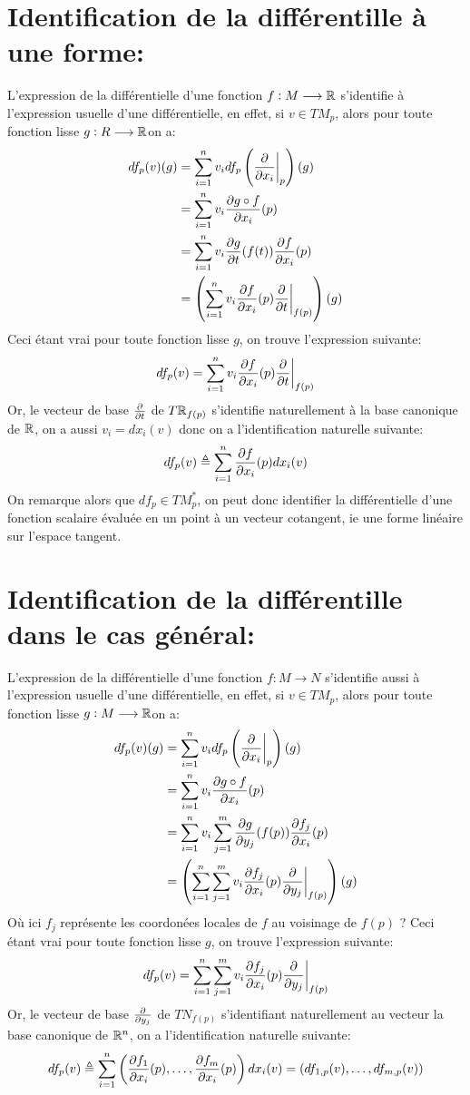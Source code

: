 \section{Identification de la différentille à une forme:}
L'expression de la différentielle d'une fonction \( f : M \longrightarrow \mathbb{R} \) s'identifie à l'expression usuelle d'une différentielle, en effet, si \( v \in TM_p \), alors pour toute fonction lisse \( g : R \longrightarrow \mathbb{R} \)on a:
\begin{align*}
   df_p(v)(g) &= \sum_{i=1}^n v_i df_p\left(\frac{\partial }{\partial x_i}\biggr|_p\right)(g)\\
   &= \sum_{i=1}^n v_i \frac{\partial g \circ f}{\partial x_i}(p)\\
   &= \sum_{i=1}^n v_i \frac{\partial g}{\partial t}(f(t))\frac{\partial f}{\partial x_i}(p)\\
   &= \left(\sum_{i=1}^n v_i \frac{\partial f}{\partial x_i}(p)\frac{\partial }{\partial t}\biggr|_{f(p)}\right)(g)
\end{align*}
Ceci étant vrai pour toute fonction lisse \( g \), on trouve l'expression suivante:
\[ 
   df_p(v) = \sum_{i=1}^n v_i \frac{\partial f}{\partial x_i}(p)\frac{\partial }{\partial t}\biggr|_{f(p)}
\]
Or, le vecteur de base \(\frac{\partial }{\partial t}\) de \( T\mathbb{R}_{f(p)} \) s'identifie naturellement à la base canonique de \( \mathbb{R} \), on a aussi \( v_i = dx_i(v) \) donc on a l'identification naturelle suivante:
\[ 
   df_p(v) \triangleq \sum_{i=1}^n \frac{\partial f}{\partial x_i}(p)dx_i(v)
\]
On remarque alors que \( df_p \in TM^*_p \), on peut donc identifier la différentielle d'une fonction scalaire évaluée en un point à un vecteur cotangent, ie une forme linéaire sur l'espace tangent.
\section{Identification de la différentille dans le cas général:}
L'expression de la différentielle d'une fonction \( f : M \longrightarrow N \) s'identifie aussi à l'expression usuelle d'une différentielle, en effet, si \( v \in TM_p \), alors pour toute fonction lisse \( g : M \longrightarrow \mathbb{R} \)on a:
\begin{align*}
   df_p(v)(g) &= \sum_{i=1}^n v_i df_p\left(\frac{\partial }{\partial x_i}\biggr|_p\right)(g)\\
   &= \sum_{i=1}^n v_i \frac{\partial g \circ f}{\partial x_i}(p)\\
   &= \sum_{i=1}^n v_i \sum_{j=1}^m \frac{\partial g}{\partial y_j}(f(p)) \frac{\partial f_j}{\partial x_i}(p)\\
   &= \left(\sum_{i=1}^n\sum_{j=1}^m v_i \frac{\partial f_j}{\partial x_i}(p)\frac{\partial }{\partial y_j}\biggr|_{f(p)}\right)(g)
\end{align*}
Où ici \( f_j \) représente les coordonées locales de \( f \) au voisinage de \( f(p) \) ? Ceci étant vrai pour toute fonction lisse \( g \), on trouve l'expression suivante:
\[ 
   df_p(v) = \sum_{i=1}^n\sum_{j=1}^m v_i \frac{\partial f_j}{\partial x_i}(p)\frac{\partial }{\partial y_j}\biggr|_{f(p)}
\]
Or, le vecteur de base \(\frac{\partial }{\partial y_j}\) de \( TN_{f(p)} \) s'identifiant naturellement au vecteur la base canonique de \( \mathbb{R}^n \), on a l'identification naturelle suivante:
\[ 
   df_p(v) \triangleq \sum_{i=1}^n \left( \frac{\partial f_1}{\partial x_i}(p), \ldots, \frac{\partial f_m}{\partial x_i}(p)\right)dx_i(v) = (df_{1, p}(v), \ldots, df_{m, p}(v))
\]

